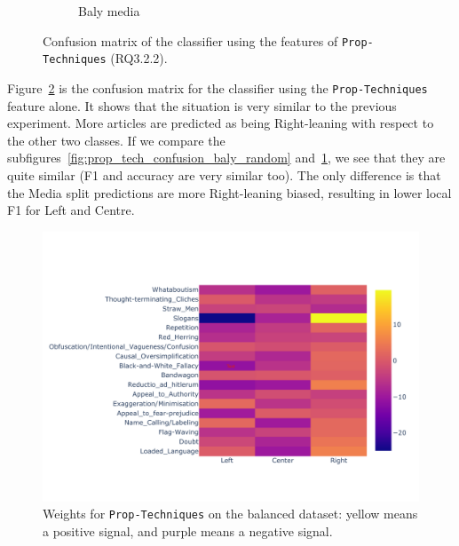 \begin{figure}[!htb]
\begin{subfigure}[b]{0.48\linewidth}
         \caption{Baly media}
         \label{fig:prop_tech_confusion_baly_media}
     \end{subfigure}
    \caption{Confusion matrix of the classifier using the features of \texttt{Prop-Techniques} (RQ3.2.2).}
    \label{fig:prop_tech_confusion}
\end{figure}


Figure~\ref{fig:prop_tech_confusion} is the confusion matrix for the classifier using the \texttt{Prop-Techniques} feature alone. It shows that the situation is very similar to the previous experiment. More articles are predicted as being Right-leaning with respect to the other two classes. %
If we compare the subfigures~\ref{fig:prop_tech_confusion_baly_random} and~\ref{fig:prop_tech_confusion_baly_media}, we see that they are quite similar (F1 and accuracy are very similar too). The only difference is that the Media split predictions are more Right-leaning biased, resulting in lower local F1 for Left and Centre.

\begin{figure}[!htb]
    \centering
    \includegraphics[width=\linewidth]{figures/nodes_stratifiedbalanced_weights_propaganda_percentages-small.pdf}
    \caption{Weights for \texttt{Prop-Techniques} on the balanced dataset: yellow means a positive signal, and purple means a negative signal.}
    \label{fig:prop_tech_weights}
\end{figure}

